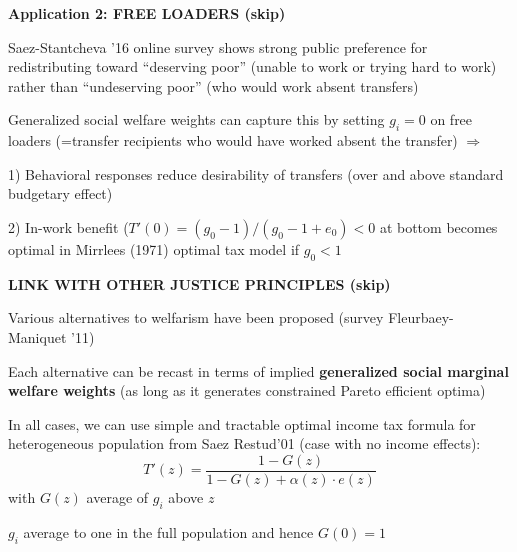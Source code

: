 \documentclass[landscape]{slides}
\begin{document}
\begin{slide}
\begin{center}
{\bf Application 2: FREE LOADERS (skip)}
\end{center}
Saez-Stantcheva '16 online survey shows strong public preference for redistributing toward ``deserving poor''
(unable to work or trying hard to work) rather than ``undeserving poor'' (who would work absent
transfers)

Generalized social welfare weights can capture this by setting $g_i=0$ on free loaders (=transfer recipients who would have worked absent the transfer) $\Rightarrow$

1) Behavioral responses reduce desirability of transfers (over and above standard budgetary effect)

2) In-work benefit ($T'(0)=(g_0-1)/(g_0-1+e_0)<0$ at bottom becomes optimal in Mirrlees (1971) optimal tax model
if $g_0<1$

\end{slide}


%
%
%
%
%
%
%

\begin{slide}
\begin{center}
{\bf LINK WITH OTHER JUSTICE PRINCIPLES (skip)}
\end{center}
Various alternatives to welfarism have been proposed (survey Fleurbaey-Maniquet '11)

Each alternative can be recast in terms of implied \textbf{generalized social marginal welfare weights} (as long
as it generates constrained Pareto efficient optima)

In all cases, we can use simple and tractable optimal income tax formula for heterogeneous population from Saez Restud'01 (case with no income effects):
\[ T'(z)=\frac{1-G(z)}{1-G(z)+\alpha(z) \cdot e(z)} \] 
with $G(z)$ average of $g_i$ above $z$

$g_i$ average to one in the full population and hence $G(0)=1$
\end{slide}
\end{document}

